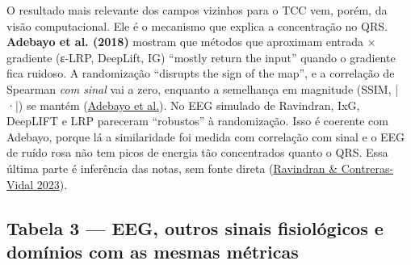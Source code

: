 \documentclass[11pt,a4paper]{article}
\begin{document}
O resultado mais relevante dos campos vizinhos para o TCC vem, porém, da visão computacional. Ele é o mecanismo que explica a concentração no QRS. \textbf{Adebayo et al. (2018)} mostram que métodos que aproximam entrada × gradiente (ε-LRP, DeepLift, IG) ``mostly return the input'' quando o gradiente fica ruidoso. A randomização ``disrupts the sign of the map'', e a correlação de Spearman \textit{com sinal} vai a zero, enquanto a semelhança em magnitude (SSIM, |·|) se mantém (\href{https://arxiv.org/abs/1810.03292}{Adebayo et al.}). No EEG simulado de Ravindran, IxG, DeepLIFT e LRP pareceram ``robustos'' à randomização. Isso é coerente com Adebayo, porque lá a similaridade foi medida com correlação com sinal e o EEG de ruído rosa não tem picos de energia tão concentrados quanto o QRS. Essa última parte é inferência das notas, sem fonte direta (\href{https://pmc.ncbi.nlm.nih.gov/articles/PMC10584975/}{Ravindran \& Contreras-Vidal 2023}).

\subsection{Tabela 3 — EEG, outros sinais fisiológicos e domínios com as mesmas métricas}
\end{document}
